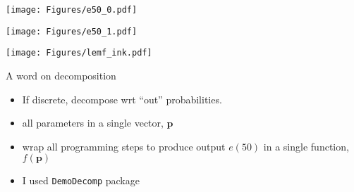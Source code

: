 \documentclass[20pt,usenames,dvipsnames]{beamer}
\begin{document}
\begin{frame}[plain]
\vspace{-1em}
\begin{center}
\texttt{[image: Figures/e50\_0.pdf]}
\end{center}
\end{frame}
\begin{frame}[plain]
\vspace{-1em}
\begin{center}
\texttt{[image: Figures/e50\_1.pdf]}
\end{center}
\end{frame}

%

\begin{frame}[plain]
\Large\begin{center}
\texttt{[image: Figures/lemf\_ink.pdf]}
\end{center}
\end{frame}

\begin{frame}[plain]
\Large
A word on decomposition
\vspace{2em}
\begin{itemize}
\item If discrete, decompose wrt ``out'' probabilities.
\item all parameters in a single vector, $\textbf{p}$
\item wrap all programming steps to produce output $e(50)$ in a single function, $f(\textbf{p})$
\item I used \texttt{DemoDecomp} package
\end{itemize}
\end{frame}
\end{document}
